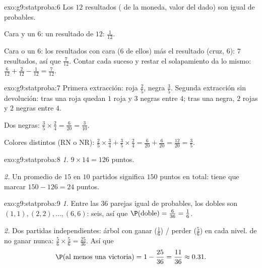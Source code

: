 \begin{solution}{exo:g9:statproba:6}
Los $12$ resultados ( de la moneda, valor del dado) son igual de
probables.

Cara y un $6$: un resultado de $12$: $\frac{1}{12}$.

Cara o un $6$: los resultados con cara ($6$ de ellos) más el resultado
(cruz, $6$): $7$ resultados, así que $\frac{7}{12}$. Contar cada suceso y
restar el solapamiento da lo mismo:
$\frac{6}{12} + \frac{2}{12} - \frac{1}{12} = \frac{7}{12}$.
\end{solution}

\begin{solution}{exo:g9:statproba:7}
Primera extracción: roja $\frac25$, negra $\frac35$. Segunda extracción sin
devolución: tras una roja quedan $1$ roja y $3$ negras entre $4$; tras
una negra, $2$ rojas y $2$ negras entre $4$.

Dos negras: $\frac35 \times \frac24 = \frac{6}{20} = \frac{3}{10}$.

Colores distintos (RN o NR):
$\frac25 \times \frac34 + \frac35 \times \frac24
= \frac{6}{20} + \frac{6}{20} = \frac{12}{20} = \frac35$.
\end{solution}

\begin{solution}{exo:g9:statproba:8}
\emph{1.} $9 \times 14 = 126$ puntos.

\emph{2.} Un promedio de $15$ en $10$ partidos significa $150$ puntos en
total: tiene que marcar $150 - 126 = 24$ puntos.
\end{solution}

\begin{solution}{exo:g9:statproba:9}
\emph{1.} Entre las $36$ parejas igual de probables, los dobles son
$(1,1), (2,2), \dots, (6,6)$: seis, así que
$\P(\text{doble}) = \frac{6}{36} = \frac16$.

\emph{2.} Dos partidas independientes: árbol con ganar ($\frac16$) / perder
($\frac56$) en cada nivel.  de no ganar nunca:
$\frac56 \times \frac56 = \frac{25}{36}$. Así que
\[
\P(\text{al menos una victoria}) = 1 - \frac{25}{36} = \frac{11}{36}
\approx 0.31 .
\]
\end{solution}

